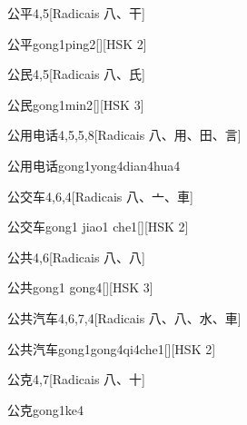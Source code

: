 \begin{entry}{公平}{4,5}[Radicais ⼋、⼲]
  \begin{phonetics}{公平}{gong1ping2}[][HSK 2]
  \end{phonetics}
\end{entry}

\begin{entry}{公民}{4,5}[Radicais ⼋、⽒]
  \begin{phonetics}{公民}{gong1min2}[][HSK 3]
  \end{phonetics}
\end{entry}

\begin{entry}{公用电话}{4,5,5,8}[Radicais ⼋、⽤、⽥、⾔]
  \begin{phonetics}{公用电话}{gong1yong4dian4hua4}
  \end{phonetics}
\end{entry}

\begin{entry}{公交车}{4,6,4}[Radicais ⼋、⼇、⾞]
  \begin{phonetics}{公交车}{gong1 jiao1 che1}[][HSK 2]
  \end{phonetics}
\end{entry}

\begin{entry}{公共}{4,6}[Radicais ⼋、⼋]
  \begin{phonetics}{公共}{gong1 gong4}[][HSK 3]
  \end{phonetics}
\end{entry}

\begin{entry}{公共汽车}{4,6,7,4}[Radicais ⼋、⼋、⽔、⾞]
  \begin{phonetics}{公共汽车}{gong1gong4qi4che1}[][HSK 2]
  \end{phonetics}
\end{entry}

\begin{entry}{公克}{4,7}[Radicais ⼋、⼗]
  \begin{phonetics}{公克}{gong1ke4}
  \end{phonetics}
\end{entry}

